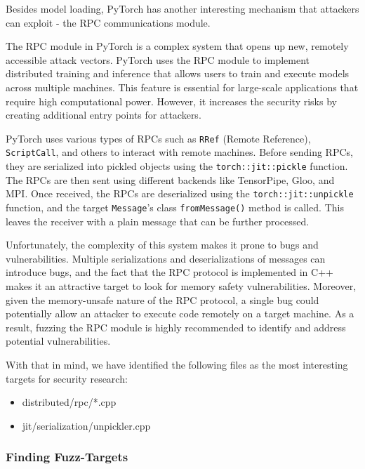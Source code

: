 Besides model loading, PyTorch has another interesting mechanism that attackers can exploit - the RPC communications module.

The RPC module in PyTorch is a complex system that opens up new, remotely accessible attack vectors. PyTorch uses the RPC module to implement distributed training and inference that allows users to train and execute models across multiple machines. This feature is essential for large-scale applications that require high computational power. However, it increases the security risks by creating additional entry points for attackers.

PyTorch uses various types of RPCs such as \texttt{RRef} (Remote Reference),\\ \texttt{ScriptCall}, and others to interact with remote machines. Before sending RPCs, they are serialized into pickled objects using the \texttt{torch::jit::pickle} function. The RPCs are then sent using different backends like TensorPipe, Gloo, and MPI. Once received, the RPCs are deserialized using the \texttt{torch::jit::unpickle} function, and the target \texttt{Message}'s class \texttt{fromMessage()} method is called. This leaves the receiver with a plain message that can be further processed.

Unfortunately, the complexity of this system makes it prone to bugs and vulnerabilities. Multiple serializations and deserializations of messages can introduce bugs, and the fact that the RPC protocol is implemented in C++ makes it an attractive target to look for memory safety vulnerabilities. Moreover, given the memory-unsafe nature of the RPC protocol, a single bug could potentially allow an attacker to execute code remotely on a target machine. As a result, fuzzing the RPC module is highly recommended to identify and address potential vulnerabilities.

With that in mind, we have identified the following files as the most interesting targets for security research:

\begingroup
\begin{itemize}
    \item distributed/rpc/*.cpp
    \item jit/serialization/unpickler.cpp
\end{itemize}
\endgroup

\subsubsection{Finding Fuzz-Targets}

